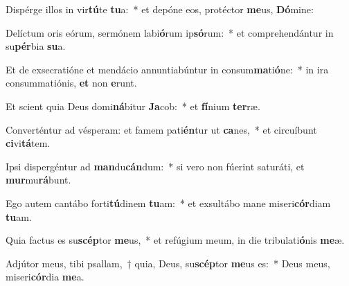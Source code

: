 \item Dispérge illos in vir\textbf{tú}te \textbf{tu}a:~* et depóne eos, protéctor \textbf{me}us, \textbf{Dó}mine:
\item Delíctum oris eórum, sermónem labi\textbf{ó}rum ip\textbf{só}rum:~* et comprehendántur in su\textbf{pér}bia \textbf{su}a.
\item Et de exsecratióne et mendácio annuntiabúntur in consum\textbf{ma}ti\textbf{ó}ne:~* in ira consummatiónis, \textbf{et} non \textbf{e}runt.
\item Et scient quia Deus domi\textbf{ná}bitur \textbf{Ja}cob:~* et \textbf{fí}nium \textbf{ter}ræ.
\item Converténtur ad vésperam: et famem pati\textbf{én}tur ut \textbf{ca}nes,~* et circuíbunt \textbf{ci}vi\textbf{tá}tem.
\item Ipsi dispergéntur ad \textbf{man}du\textbf{cán}dum:~* si vero non fúerint saturáti, et \textbf{mur}mu\textbf{rá}bunt.
\item Ego autem cantábo forti\textbf{tú}dinem \textbf{tu}am:~* et exsultábo mane miseri\textbf{cór}diam \textbf{tu}am.
\item Quia factus es su\textbf{scép}tor \textbf{me}us,~* et refúgium meum, in die tribulati\textbf{ó}nis \textbf{me}æ.
\item Adjútor meus, tibi psallam,~† quia, Deus, su\textbf{scép}tor \textbf{me}us es:~* Deus meus, miseri\textbf{cór}dia \textbf{me}a.
